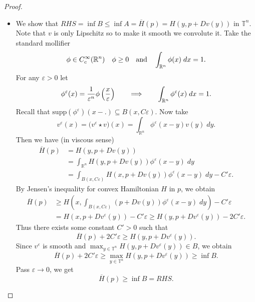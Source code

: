 \documentclass[12pt, oneside]{amsart}  	%
\begin{document}
\begin{proof}
\begin{itemize}
\item We show that $RHS = \inf B\le \inf A= \overline{H}(p)=H(y, p + Dv(y))$ in $\mathbb{T}^n$. Note that $v$ is only Lipschitz so to make it smooth we convolute it. Take the standard mollifier
\begin{equation*}
\phi\in C^\infty_c(\mathbb{R}^n)\quad \phi \ge 0\quad\text{and}\quad \int_{\mathbb{R}^n} \phi(x)\;dx =1.
\end{equation*}
For any $\varepsilon>0$ let
\begin{equation*}
\phi^\varepsilon(x) = \frac{1}{\varepsilon^n}\phi\left(\frac{x}{\varepsilon} \right) \qquad\Longrightarrow\qquad   \int_{\mathbb{R}^n}\phi^\varepsilon(x)\;dx=1.
\end{equation*}
Recall that $\text{supp}(\phi^\varepsilon)(x-.) \subseteq B(x,C\varepsilon)$. Now take
\begin{equation*}
v^\varepsilon(x) = \Big(v^\varepsilon \star v\Big)(x) = \int_{\mathbb{R}^n} \phi^\varepsilon(x-y)v(y)\;dy.
\end{equation*}
Then we have (in viscous sense)
\begin{align*}
\overline{H}(p) &= H(y,p+Dv(y))\\
           &= \int_{\mathbb{R}^n} H(y,p+Dv(y))\phi^\varepsilon(x-y)\;dy\\
           &= \int_{B(x,C\varepsilon)} H(x,p+Dv(y))\phi^\varepsilon(x-y)\;dy  - C'\varepsilon.
\end{align*}
By Jensen's inequality for convex Hamiltonian $H$ in $p$, we obtain
\begin{align*}
\overline{H}(p) &\geq H\left(x, \int_{B(x,C\varepsilon)} (p+Dv(y))\phi^\varepsilon(x-y)\;dy\right) - C'\varepsilon\\
 		   &= H(x,p+Dv^\varepsilon(y)) - C'\varepsilon \geq H(y,p+Dv^\varepsilon(y)) - 2C'\varepsilon.
\end{align*}
Thus there exists some constant $C'>0$ such that
\begin{equation*}
\overline{H}(p) + 2C'\varepsilon \geq H(y,p+Dv^\varepsilon(y)).
\end{equation*}
Since $v^\varepsilon$ is smooth and $\max_{y\in \mathbb{T}^n} H(y,p+Dv^\varepsilon(y))\in B$, we obtain
\begin{equation*}
\overline{H}(p) + 2C'\varepsilon \geq \max_{y\in \mathbb{T}^n} H(y,p+Dv^\varepsilon(y))\geq \inf B.
\end{equation*}
Pass $\varepsilon \longrightarrow 0$, we get
\begin{equation*}
\overline{H}(p) \geq \inf B = RHS.
\end{equation*}
\end{itemize}
\end{proof}
\end{document}

